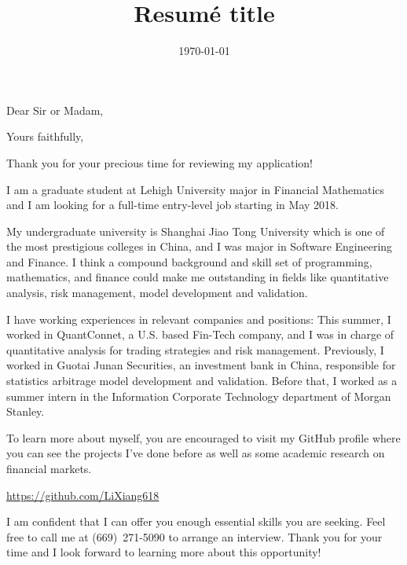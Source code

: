 \documentclass[11pt,a4paper,sans]{moderncv}        %
\title{Resumé title}                               %
\begin{document}
\date{\today}
\opening{Dear Sir or Madam,}
\closing{Yours faithfully,}

\makelettertitle

Thank you for your precious time for reviewing my application!

I am a graduate student at Lehigh University major in Financial Mathematics and I am looking for a full-time entry-level job starting in May 2018. 

My undergraduate university is Shanghai Jiao Tong University which is one of the most prestigious colleges in China, and I was major in Software Engineering and Finance. I think a compound background and skill set of programming, mathematics, and finance could make me outstanding in fields like quantitative analysis, risk management, model development and validation.

I have working experiences in relevant companies and positions: This summer, I worked in QuantConnet, a U.S. based Fin-Tech company, and I was in charge of quantitative analysis for trading strategies and risk management. Previously, I worked in Guotai Junan Securities, an investment bank in China, responsible for statistics arbitrage model development and validation. Before that, I worked as a summer intern in the Information Corporate Technology department of Morgan Stanley.

To learn more about myself, you are encouraged to visit my GitHub profile where you can see the projects I've done before as well as some academic research on financial markets.

\href{https://github.com/LiXiang618}{https://github.com/LiXiang618}

I am confident that I can offer you enough essential skills you are seeking. Feel free to call me at (669)~271-5090 to arrange an interview. Thank you for your time and I look forward to learning more about this opportunity!

\makeletterclosing
\end{document}

